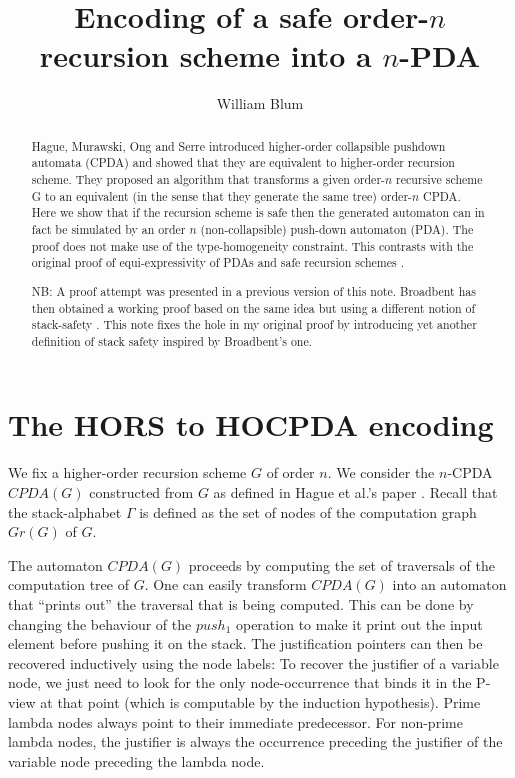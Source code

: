 \documentclass[a4paper,draft]{article}
\author{William Blum}
\title{Encoding of a safe order-$n$ recursion scheme into a $n$-PDA}
\theoremstyle{remark}
\theoremstyle{definition}
\begin{document}
\maketitle
\begin{abstract}
Hague, Murawski, Ong and Serre \cite{hmos-lics08} introduced
higher-order collapsible pushdown automata (CPDA) and showed that they are
equivalent to higher-order recursion scheme. They proposed an
algorithm that transforms a given order-$n$ recursive scheme G to
an equivalent (in the sense that they generate the same tree) order-$n$ CPDA. Here we show that if the recursion
scheme is safe then the generated automaton can in fact be simulated by an order
$n$ (non-collapsible) push-down automaton (PDA). The proof does not make
use of the type-homogeneity constraint. This contrasts with the original proof
of equi-expressivity of PDAs and safe recursion schemes \cite{KNU02}.

NB: A proof attempt was presented in a previous version of this note. Broadbent has then
obtained a working proof based on the same idea but using a different notion of stack-safety \cite{Broadbent2009}.
This note fixes the hole in my original proof by introducing yet another definition of stack safety inspired
by Broadbent's one.
\end{abstract}

\section{The HORS to HOCPDA encoding}

We fix a higher-order recursion scheme $G$ of order $n$.
We consider the $n$-CPDA $CPDA(G)$ constructed from $G$ as defined in Hague et al.'s paper \cite[Definition 5.2]{hague-collaps-full}.
Recall that the stack-alphabet $\Gamma$ is defined as the set of nodes of the computation graph $Gr(G)$ of $G$.

The automaton $CPDA(G)$ proceeds by computing the set of traversals of the computation tree of $G$. One can easily transform $CPDA(G)$ into an automaton that ``prints out'' the traversal that is being computed. This can be done by changing the behaviour of the $push_1$ operation to make it print out the input element before pushing it on the stack. The justification pointers can then be recovered inductively using the node labels: To recover the justifier of a variable node, we just need to look for the only node-occurrence that binds it in the P-view at that point (which is computable by the induction hypothesis).
Prime lambda nodes always point to their immediate predecessor. For non-prime lambda nodes, the justifier is always the occurrence preceding the justifier of the variable node preceding the lambda node.
\end{document}

